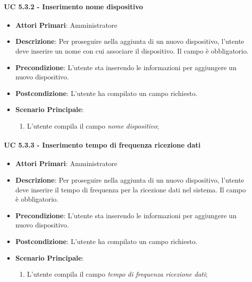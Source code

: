 				\paragraph{UC 5.3.2 - Inserimento nome dispositivo}
				\begin{itemize}
					\item \textbf{Attori Primari}: Amministratore
					\item \textbf{Descrizione}: Per proseguire nella aggiunta di un nuovo dispositivo, l'utente deve inserire un nome con cui associare il dispositivo. Il campo è obbligatorio.
					\item \textbf{Precondizione}: L'utente sta inserendo le informazioni per aggiungere un nuovo dispositivo.
					\item \textbf{Postcondizione}: L'utente ha compilato un campo richiesto.
					\item \textbf{Scenario Principale}:
					\begin{enumerate}
						\item{L'utente compila il campo \textit{nome dispositivo};}
					\end{enumerate}
				\end{itemize}

				\paragraph{UC 5.3.3 - Inserimento tempo di frequenza ricezione dati}
				\begin{itemize}
					\item \textbf{Attori Primari}: Amministratore
					\item \textbf{Descrizione}: Per proseguire nella aggiunta di un nuovo dispositivo, l'utente deve inserire il tempo di frequenza per la ricezione dati nel sistema. Il campo è obbligatorio.
					\item \textbf{Precondizione}: L'utente sta inserendo le informazioni per aggiungere un nuovo dispositivo.
					\item \textbf{Postcondizione}: L'utente ha compilato un campo richiesto.
					\item \textbf{Scenario Principale}:
					\begin{enumerate}
						\item{L'utente compila il campo \textit{tempo di frequenza ricezione dati};}
					\end{enumerate}
				\end{itemize}

